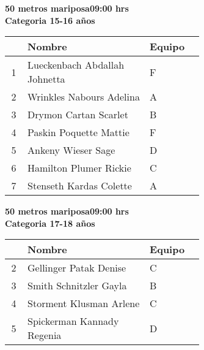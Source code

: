 \begin{minipage}{0.95\linewidth}\vspace{0.5cm} 
\begin{flushleft}
\textbf{
\hspace{-0.15cm}50 metros mariposa\hspace{1.5cm}09:00 hrs \\Categoria 15-16 años}\vspace{-0.2cm} 
\end{flushleft}
\begin{tabular}{cp{0.63\linewidth}l}
\hline
& \textbf{Nombre} & \textbf{Equipo} \\ \hline
1 & Lueckenbach Abdallah Johnetta & F \\ 
2 & Wrinkles Nabours Adelina & A \\ 
3 & Drymon Cartan Scarlet & B \\ 
4 & Paskin Poquette Mattie & F \\ 
5 & Ankeny Wieser Sage & D \\ 
6 & Hamilton Plumer Rickie & C \\ 
7 & Stenseth Kardas Colette & A \\ 
\end{tabular}
\end{minipage}
\begin{minipage}{0.95\linewidth}\vspace{0.5cm} 
\begin{flushleft}
\textbf{
\hspace{-0.15cm}50 metros mariposa\hspace{1.5cm}09:00 hrs \\Categoria 17-18 años}\vspace{-0.2cm} 
\end{flushleft}
\begin{tabular}{cp{0.63\linewidth}l}
\hline
& \textbf{Nombre} & \textbf{Equipo} \\ \hline
2 & Gellinger Patak Denise & C \\ 
3 & Smith Schnitzler Gayla & B \\ 
4 & Storment Klusman Arlene & C \\ 
5 & Spickerman Kannady Regenia & D \\ 
\end{tabular}
\end{minipage}
